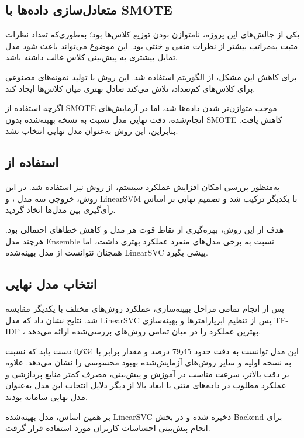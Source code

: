 \subsection{متعادل‌سازی داده‌ها با SMOTE}
یکی از چالش‌های این پروژه، نامتوازن بودن توزیع کلاس‌ها بود؛ به‌طوری‌که تعداد نظرات مثبت به‌مراتب بیشتر از نظرات منفی و خنثی بود. این موضوع می‌تواند باعث شود مدل تمایل بیشتری به پیش‌بینی کلاس غالب داشته باشد.

برای کاهش این مشکل، از الگوریتم  استفاده شد. این روش با تولید نمونه‌های مصنوعی برای کلاس‌های کم‌تعداد، تلاش می‌کند تعادل بهتری میان کلاس‌ها ایجاد کند.

اگرچه استفاده از SMOTE موجب متوازن‌تر شدن داده‌ها شد، اما در آزمایش‌های انجام‌شده، دقت نهایی مدل نسبت به نسخه بهینه‌شده بدون SMOTE کاهش یافت. بنابراین، این روش به‌عنوان مدل نهایی انتخاب نشد.
\subsection{استفاده از }
به‌منظور بررسی امکان افزایش عملکرد سیستم، از روش  نیز استفاده شد. در این روش، خروجی سه مدل  ،  و LinearSVM با یکدیگر ترکیب شد و تصمیم نهایی بر اساس رأی‌گیری بین مدل‌ها اتخاذ گردید.

هدف از این روش، بهره‌گیری از نقاط قوت هر مدل و کاهش خطاهای احتمالی بود. هرچند مدل Ensemble نسبت به برخی مدل‌های منفرد عملکرد بهتری داشت، اما همچنان نتوانست از مدل بهینه‌شده LinearSVC پیشی بگیرد.
\subsection{انتخاب مدل نهایی}
پس از انجام تمامی مراحل بهینه‌سازی، عملکرد روش‌های مختلف با یکدیگر مقایسه شد. نتایج نشان داد که مدل LinearSVC پس از تنظیم ابرپارامترها و بهینه‌سازی TF-IDF ، بهترین عملکرد را در میان تمامی روش‌های بررسی‌شده ارائه می‌دهد.

این مدل توانست به دقت حدود 79٫45 درصد و مقدار  برابر با 0٫634 دست یابد که نسبت به نسخه اولیه و سایر روش‌های آزمایش‌شده بهبود محسوسی را نشان می‌دهد. علاوه بر دقت بالاتر، سرعت مناسب در آموزش و پیش‌بینی، مصرف کمتر منابع پردازشی و عملکرد مطلوب در داده‌های متنی با ابعاد بالا از دیگر دلایل انتخاب این مدل به‌عنوان مدل نهایی سامانه بودند.

بر همین اساس، مدل بهینه‌شده LinearSVC ذخیره شده و در بخش Backend برای انجام پیش‌بینی احساسات کاربران مورد استفاده قرار گرفت.

